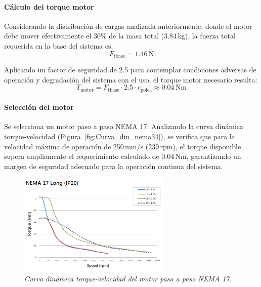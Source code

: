 \paragraph{Cálculo del torque motor}
Considerando la distribución de cargas analizada anteriormente, donde el motor debe mover efectivamente el 30\% de la masa total (3.84\,kg), la fuerza total requerida en la base del sistema es:
\begin{equation}
F_{\text{tbase}} = 1.46\,\text{N}
\end{equation}

Aplicando un factor de seguridad de 2.5 para contemplar condiciones adversas de operación y degradación del sistema con el uso, el torque motor necesario resulta:
\begin{equation}
T_{\text{motor}} = F_{\text{tbase}} \cdot 2.5 \cdot r_{\text{polea}} \approx 0.04\,\text{Nm}
\label{eq:torque_motor}
\end{equation}

\paragraph{Selección del motor}
Se selecciona un motor paso a paso NEMA 17. Analizando la curva dinámica torque-velocidad (Figura~\ref{fig:Curva_din_nema34}), se verifica que para la velocidad máxima de operación de 250\,mm/s (239\,rpm), el torque disponible supera ampliamente el requerimiento calculado de 0.04\,Nm, garantizando un margen de seguridad adecuado para la operación continua del sistema.

\begin{figure}[H]
    \centering
    \includegraphics[width=0.65\textwidth]{img/Nema17.png}
    \caption{\textit{Curva dinámica torque-velocidad del motor paso a paso NEMA 17.}}
    \label{fig:Curva_din_nema17}
\end{figure}